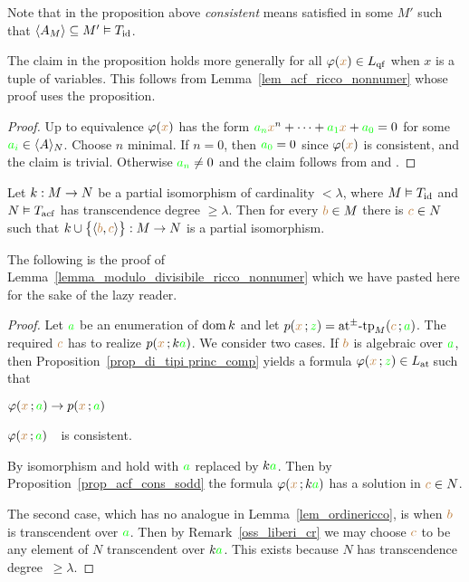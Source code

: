 \documentclass[creche.tex]{subfiles}
\begin{document}
Note that in the proposition above \textit{consistent\/} means satisfied in some $M'$ such that $\<A_M\>\subseteq M'\models T_{\rm id}$.

The claim in the proposition holds more generally for all $\phi({\mr x})\in L_{\rm qf}$ when $x$ is a tuple of variables. This follows from Lemma~\ref{lem_acf_ricco_nonnumer} whose proof uses the proposition.

\begin{proof}
Up to equivalence $\phi({\mr x})$ has the form ${\gr a_n}{\mr x}^n + \dots + {\gr a_1} {\mr x} + {\gr a_0}=0$ for some ${\gr a_i}\in\<A\>_N$. Choose $n$ minimal. If $n=0$, then ${\gr a_0}=0$ since $\phi({\mr x})$ is consistent, and the claim is trivial. Otherwise ${\gr a_n}\neq0$ and the claim follows from  and . 
\end{proof}

\begin{lemma}\label{lem_acf_ricco_nonnumer}
Let $k:M\imp N$ be a partial isomorphism of cardinality $<\lambda$, where $M\models T_{\rm id}$ and $N\models T_{\rm acf}$ has transcendence degree $\ge\lambda$. Then for every ${\mr b}\in M$ there is ${\mr c}\in N$ such that $k\cup\big\{\<{\mr b},{\mr c}\>\big\}:M\imp N$ is a partial isomorphism.
\end{lemma}

The following is the proof of Lemma~\ref{lemma_modulo_divisibile_ricco_nonnumer} which we have pasted here for the sake of the lazy reader.

\begin{proof}
Let ${\gr a}$ be an enumeration of $\dom k$ and let $p({\mr x}\,;{\gr z})=\atpmtp_M({\mr c}\,;{\gr a})$. The required ${\mr c}$ has to realize $p({\mr x}\,;k{\gr a})$. We consider two cases. If ${\mr b}$ is algebraic over ${\gr a}$, then Proposition~\ref{prop_di_tipi princ_comp} yields a formula $\phi({\mr x}\,;{\gr z})\in\atL$ such that 

\noindent{}\hspace{5ex} $\phi({\mr x}\,;{\gr a})\imp p({\mr x}\,;{\gr a})$

\noindent{}\hspace{5ex} $\phi({\mr x}\,;{\gr a})$\ \ is consistent.

By isomorphism  and  hold with ${\gr a}$ replaced by $k{\gr a}$. Then by Proposition~\ref{prop_acf_cons_sodd} the formula $\phi({\mr x}\,;k{\gr a})$ has a solution in ${\mr c}\in N$.

The second case, which has no analogue in Lemma~\ref{lem_ordinericco}, is when ${\mr b}$ is transcendent over ${\gr a}$. Then by  Remark~\ref{oss_liberi_cr} we may choose ${\mr c}$ to be any element of $N$ transcendent over $k{\gr a}$. This exists because $N$ has transcendence degree $\ \ge\lambda$. 
\end{proof}
\end{document}
